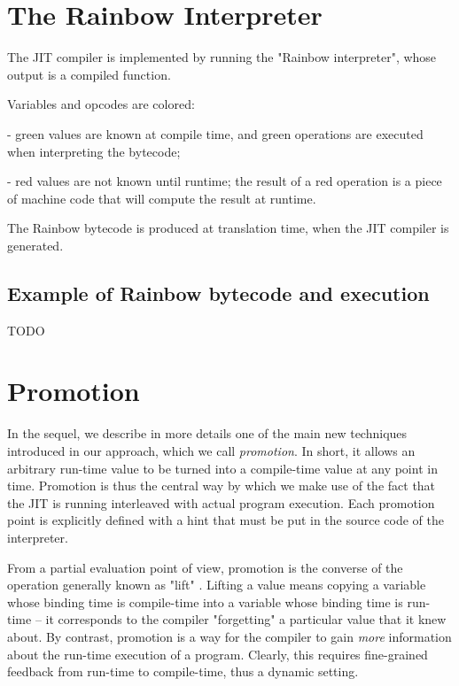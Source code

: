 \section{The Rainbow Interpreter}

The JIT compiler is implemented by running the "Rainbow interpreter", whose
output is a compiled function.

Variables and opcodes are colored:

  - green values are known at compile time, and green operations are executed
    when interpreting the bytecode;

  - red values are not known until runtime; the result of a red operation is a
    piece of machine code that will compute the result at runtime.

The Rainbow bytecode is produced at translation time, when the JIT compiler is
generated.


\subsection{Example of Rainbow bytecode and execution}

TODO

\section{Promotion}

In the sequel, we describe in more details one of the main new
techniques introduced in our approach, which we call \emph{promotion}.  In
short, it allows an arbitrary run-time value to be turned into a
compile-time value at any point in time.  Promotion is thus the central way by
which we make use of the fact that the JIT is running interleaved with actual
program execution. Each promotion point is explicitly defined with a hint that
must be put in the source code of the interpreter.

From a partial evaluation point of view, promotion is the converse of
the operation generally known as "lift" \cite{XXX}.  Lifting a value means
copying a variable whose binding time is compile-time into a variable
whose binding time is run-time – it corresponds to the compiler
"forgetting" a particular value that it knew about.  By contrast,
promotion is a way for the compiler to gain \emph{more} information about
the run-time execution of a program. Clearly, this requires
fine-grained feedback from run-time to compile-time, thus a
dynamic setting.

